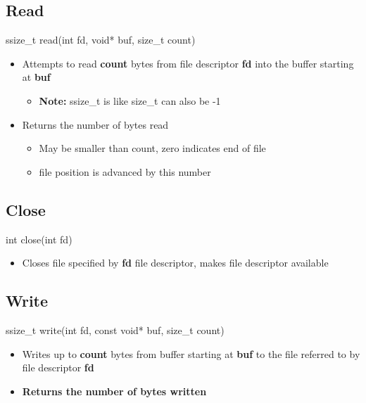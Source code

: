 \documentclass{report}
\begin{document}
    \bigbreak \noindent 
    \subsection{Read}
    \bigbreak \noindent 
    \begin{cppcode}
    ssize_t read(int fd, void* buf, size_t count)
    \end{cppcode}
    \begin{itemize}
        \item Attempts to read \textbf{count} bytes from file descriptor \textbf{fd} into the buffer starting at \textbf{buf}
            \begin{itemize}
                \item \textbf{Note:} ssize\_t is like size\_t can also be -1
            \end{itemize}
        \item Returns the number of bytes read
            \begin{itemize}
                \item May be smaller than count, zero indicates end of file
                \item file position is advanced by this number
            \end{itemize}
    \end{itemize}
    \bigbreak \noindent 

    \bigbreak \noindent 
    \subsection{Close}
    \bigbreak \noindent 
    \begin{cppcode}
    int close(int fd)
    \end{cppcode}
    \begin{itemize}
        \item Closes file specified by \textbf{fd} file descriptor, makes file descriptor available
    \end{itemize}
    \bigbreak \noindent 

    \bigbreak \noindent 
    \subsection{Write}
    \bigbreak \noindent 
    \begin{cppcode}
        ssize_t write(int fd, const void* buf, size_t count)
    \end{cppcode}
    \begin{itemize}
        \item Writes up to \textbf{count} bytes from buffer starting at \textbf{buf} to the file referred to by file descriptor \textbf{fd}
        \item \textbf{Returns the number of bytes written}
    \end{itemize}
    \bigbreak \noindent 
\end{document}
